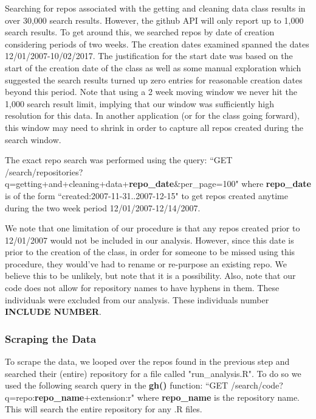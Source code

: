 \documentclass[12pt]{article}\usepackage[]{graphicx}\usepackage[]{color}
\begin{document}
Searching for repos associated with the getting and cleaning data class results in over 30,000 search results. 
However, the github API will only report up to 1,000 search results. To get around this, we searched repos by date of creation 
considering periods of two weeks. The creation dates examined spanned the dates 12/01/2007-10/02/2017. 
The justification for the start date was based on the start of the creation date of the class as well as 
some manual exploration which suggested the search results turned up zero entries for reasonable creation dates beyond this period. 
Note that using a 2 week moving window we never hit the 1,000 search result limit, implying that our window was sufficiently high 
resolution for this data. In another application (or for the class going forward), this window may need to shrink in order to capture 
all repos created during the search window.

The exact repo search was performed using the query: 
``GET /search/repositories?q=getting+and+cleaning+data+\textbf{repo\_date}\&per\_page=100" where \textbf{repo\_date} is of the form 
``created:2007-11-31..2007-12-15" to get repos created anytime during the two week period 12/01/2007-12/14/2007. 

We note that one limitation of our procedure is that any repos created prior to 12/01/2007 would not be included in our analysis. 
However, since this date is prior to the creation of the class, in order for someone to be missed using this procedure, they would've 
had to rename or re-purpose an existing repo. We believe this to be unlikely, but note that it is a possibility.
Also, note that our code does not allow for repository names to have hyphens in them. These individuals were excluded from our 
analysis. These individuals number {\color{red}\textbf{INCLUDE NUMBER}}.




\subsubsection{Scraping the Data}

To scrape the data, we looped over the repos found in the previous step and searched their (entire) repository for a file 
called "run\_analysis.R". To do so we used the following search query in the \textbf{gh()} function: 
``GET /search/code?q=repo:\textbf{repo\_name}+extension:r" where \textbf{repo\_name} is the repository name. 
This will search the entire repository for any .R files. 
\end{document}
